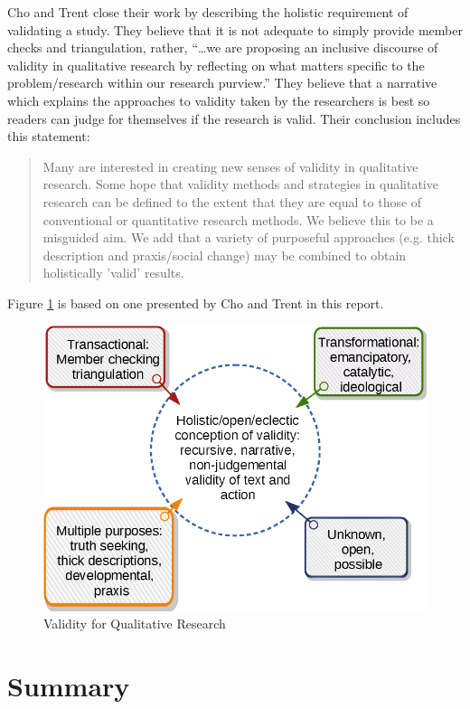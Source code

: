 Cho and Trent close their work by describing the holistic requirement of validating a study. They believe that it is not adequate to simply provide member checks and triangulation, rather, ``\ldots we are proposing an inclusive discourse of validity in qualitative research by reflecting on what matters specific to the problem/research within our research purview.'' They believe that a narrative which explains the approaches to validity taken by the researchers is best so readers can judge for themselves if the research is valid. Their conclusion includes this statement:

\begin{quote}
	Many are interested in creating new senses of validity in qualitative research. Some hope that validity methods and strategies in qualitative research can be defined to the extent that they are equal to those of conventional or quantitative research methods. We believe this to be a misguided aim. We add that a variety of purposeful approaches (e.g. thick description and praxis/social change) may be combined to obtain holistically 'valid' results.
\end{quote}

Figure \ref{05:fig05} is based on one presented by Cho and Trent in this report.

\begin{figure}[H]
	\centering
	\includegraphics[width=\maxwidth{.95\linewidth}]{gfx/05-cho}
	\caption{Validity for Qualitative Research}
	\label{05:fig05}
\end{figure}

\section{Summary}\label{ch05:summary}

